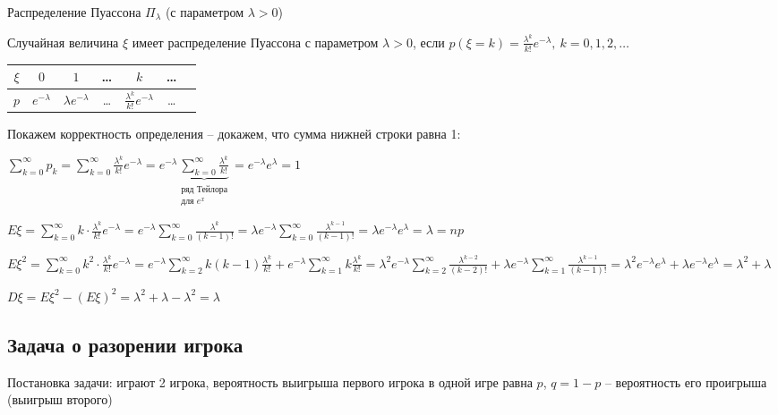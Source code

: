 \documentclass[12pt]{article}
\begin{document}
    \hypertarget{poissondistribution}{}

    Распределение Пуассона $\Pi_\lambda$ (с параметром $\lambda > 0$)

    \Def Случайная величина $\xi$ имеет распределение Пуассона с параметром $\lambda > 0$, если $p(\xi = k) = \frac{\lambda^k}{k!}e^{-\lambda}, \ k = 0, 1, 2, \dots$

    \smallvspace

    \begin{tabular}{c|c|c|c|c|c|c}
        $\xi$ & $0$ & $1$ & \dots & $k$ & \dots   \\
        \hline
        $p$   & $e^{-\lambda}$ & $\lambda e^{-\lambda}$ & \dots & $\frac{\lambda^k}{k!}e^{-\lambda}$ & \dots 
    \end{tabular}

    \smallvspace

    Покажем корректность определения -- докажем, что сумма нижней строки равна 1:

    $\sum_{k = 0}^\infty p_k = \sum_{k = 0}^\infty \frac{\lambda^k}{k!} e^{-\lambda} = e^{-\lambda} \underset{\substack{\text{ряд Тейлора}\\ \text{для } e^x}}{\underbrace{\sum_{k = 0}^\infty \frac{\lambda^k}{k!}}} = e^{-\lambda} e^\lambda = 1$

    $E\xi = \sum_{k = 0}^\infty k \cdot \frac{\lambda^k}{k!}e^{-\lambda} = e^{-\lambda} \sum_{k = 0}^\infty \frac{\lambda^k}{(k - 1)!} = 
    \lambda e^{-\lambda} \sum_{k = 0}^\infty \frac{\lambda^{k - 1}}{(k - 1)!} = \lambda e^{-\lambda} e^\lambda = \lambda = np$

    
    $E\xi^2 = \sum_{k = 0}^\infty k^2 \cdot \frac{\lambda^k}{k!}e^{-\lambda} = e^{-\lambda} \sum_{k = 2}^\infty k(k - 1) \frac{\lambda^k}{k!} + 
    e^{-\lambda} \sum_{k = 1}^\infty k \frac{\lambda^k}{k!} = \lambda^2 e^{-\lambda} \sum_{k = 2}^\infty \frac{\lambda^{k - 2}}{(k - 2)!} + 
    \lambda e^{-\lambda} \sum_{k = 1}^\infty \frac{\lambda^{k - 1}}{(k - 1)!} = \lambda^2 e^{-\lambda} e^\lambda + \lambda e^{-\lambda} e^\lambda = \lambda^2 + \lambda$

    $D\xi = E\xi^2 - (E\xi)^2 = \lambda^2 + \lambda - \lambda^2 = \lambda$

    \clearpage

    \subsection{Задача о разорении игрока}

    Постановка задачи: играют 2 игрока, вероятность выигрыша первого игрока в одной игре равна $p$, $q = 1 - p$ -- вероятность его проигрыша (выигрыш второго)
\end{document}
